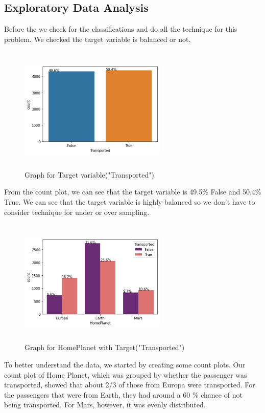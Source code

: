 \documentclass[fleqn,10pt]{SelfArx} %
\begin{document}
\subsection{Exploratory Data Analysis}
Before the we check for the classifications and do all the technique for this problem.
We checked the target variable is balanced or not.
\begin{figure}[H]
    \centering
    \includegraphics[width=7cm, height=6cm]{img/transported.png}
    \caption{Graph for Target variable("Transported")}
    \label{fig:my_label}
\end{figure}    
From the count plot, we can see that the target variable is 49.5\% False and 50.4\% True. We can see that the target variable is highly balanced so we don't have to consider technique for under or over sampling. 
\begin{figure}[H]
    \centering
    \includegraphics[width=7cm, height=6cm]{img/homeplanet.png}
    \caption{Graph for HomePlanet with Target("Transported")}
    \label{fig:my_label}
\end{figure} 
To better understand the data, we started by creating some count plots. Our count plot of Home Planet, which was grouped by whether the passenger was transported, showed that about 2/3 of those from Europa were transported. For the passengers that were from Earth, they had around a 60 \% chance of not being transported. For Mars, however, it was evenly distributed.
\end{document}
